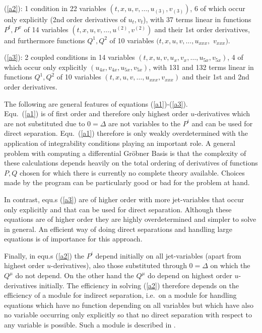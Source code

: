 (\ref{a2}): 1 condition in 22 variables $(t,x,u,v,\ldots,u_{(3)},v_{(3)})$,
6 of which occur only explicitly (2nd order derivatives of $u_t,v_t$),
with 37 terms linear in functions 
$P^t,P^x$ of 14 variables $(t,x,u,v,\ldots,u^{(2)},v^{(2)})$
and their 1st order derivatives, and furthermore
functions $Q^1,Q^2$ of 10 variables $(t,x,u,v,\ldots,u_{xxx},$ $v_{xxx})$.

(\ref{a3}): 2 coupled conditions in 14 variables $(t,x,u,v,u_x,v_x,\ldots,u_{5x},v_{5x})$,
4 of which occur only explicitly $(u_{4x},v_{4x},u_{5x},v_{5x})$,
with 131 and 132 terms linear in
functions $Q^1,Q^2$ of 10 variables $(t,x,u,v,\ldots,u_{xxx},v_{xxx})$
and their 1st and 2nd order derivatives.

The following are general features of equations (\ref{a1})-(\ref{a3}).\\
Equ.\ (\ref{a1}) is of first order and therefore only highest
order $u$-derivatives which are not substituted due to $0=\Delta$
are not variables to the $P^i$ and can be used for direct separation.
Equ.\ (\ref{a1}) therefore is only weakly overdetermined with
the application of integrability conditions playing an important role.
A general problem with computing a differential Gr\"{o}bner Basis is
that the complexity of these calculations depends
heavily on the total ordering of derivatives of functions $P, Q$
chosen for which there is currently no complete theory available.
Choices made by the program can be particularly good or bad 
for the problem at hand.

In contrast, equ.s (\ref{a3}) are of higher order with more
jet-variables that occur only explicitly and that can be used for
direct separation. Although these equations are of higher order
they are highly overdetermined and simpler to solve in general.
An efficient way of doing direct separations and handling
large equations is of importance for this approach.

Finally, in equ.s (\ref{a2})
the $P^i$ depend initially on all jet-variables
(apart from highest order $u$-derivatives), also those
substituted through $0=\Delta$ on which the $Q^{\mu}$
do not depend. On the other hand the $Q^{\mu}$ do 
depend on highest order $u$-derivatives initially.
The efficiency in solving (\ref{a2}) therefore depends on the efficiency
of a module for indirect separation, i.e.\ on a module
for handling equations which have no function depending on all variables
but which have also no variable occurring only explicitly so that no direct
separation with respect to any variable is possible. Such a module is 
described in \cite{CRACK1}.

